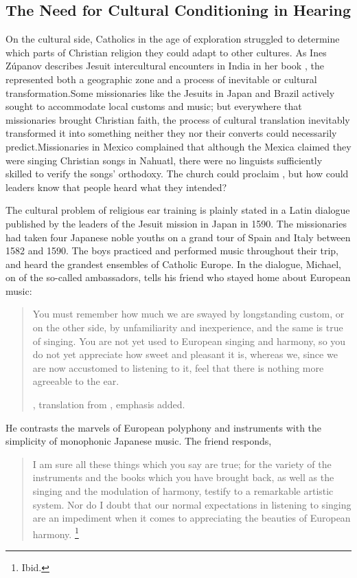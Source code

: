 \subsection{The Need for Cultural Conditioning in Hearing}

On the cultural side, Catholics in the age of exploration struggled to determine which parts of Christian religion they could adapt to other cultures.
As Ines Zúpanov describes Jesuit intercultural encounters in India in her book , the  represented both a geographic zone and a process of inevitable  or cultural transformation.\citXXX[Zupanov]
Some missionaries like the Jesuits in Japan and Brazil actively sought to accommodate local customs and music; but everywhere that missionaries brought Christian faith, the process of cultural translation inevitably transformed it into something neither they nor their converts could necessarily predict.
Missionaries in Mexico complained that although the Mexica claimed they were singing Christian songs in Nahuatl, there were no linguists sufficiently skilled to verify the songs' orthodoxy.
The church could proclaim , but how could leaders know that people heard what they intended?

The cultural problem of religious ear training is plainly stated in a Latin dialogue published by the leaders of the Jesuit mission in Japan in 1590.
The missionaries had taken four Japanese noble youths on a grand tour of Spain and Italy between 1582 and 1590.%
\autocite{Sande:DeMissioneLegatorum}
The boys practiced and performed music throughout their trip, and heard the grandest ensembles of Catholic Europe.
In the dialogue, Michael, on of the so-called ambassadors, tells his friend who stayed home about European music:
\begin{quote}
  You must remember \Dots{} how much we are swayed by longstanding custom, or on the other side, by unfamiliarity and inexperience, and the same is true of singing. 
  You are not yet used to European singing and harmony, so you do not yet appreciate how sweet and pleasant it is, whereas we, since we are now accustomed to listening to it, feel that there is nothing more agreeable to the ear.
  \begin{Footnote}
    \autocite[109--110]{Sande:DeMissioneLegatorum}, translation from \autocite[155-156]{Massarella:JapaneseTravellers}, emphasis added.
    \end{Footnote}
\end{quote}
He contrasts the marvels of European polyphony and instruments with the simplicity of monophonic Japanese music.
The friend responds,
\begin{quote}
  I am sure all these things which you say are true; for the variety of the instruments and the books which you have brought back, as well as the singing and the modulation of harmony, testify to a remarkable artistic system.
  Nor do I doubt that our normal expectations in listening to singing are an impediment when it comes to appreciating the beauties of European harmony.%
  \footnote{Ibid.}
\end{quote}

